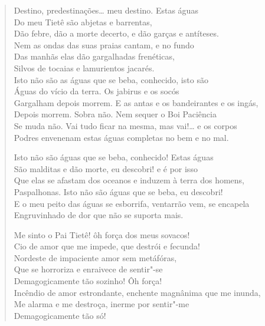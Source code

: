 \begin{verse}
Destino, predestinações\ldots{} meu destino. Estas águas\\
Do meu Tietê são abjetas e barrentas,\\
Dão febre, dão a morte decerto, e dão garças e antíteses.\\
Nem as ondas das suas praias cantam, e no fundo\\
Das manhãs elas dão gargalhadas frenéticas,\\
Silvos de tocaias e lamurientos jacarés.\\
Isto não são as águas que se beba, conhecido, isto são\\
Águas do vício da terra. Os jabirus e os socós\\
Gargalham depois morrem. E as antas e os bandeirantes e os ingás,\\
Depois morrem. Sobra não. Nem sequer o Boi Paciência\\
Se muda não. Vai tudo ficar na mesma, mas vai!\ldots{} e os corpos\\
Podres envenenam estas águas completas no bem e no mal.

Isto não são águas que se beba, conhecido! Estas águas\\
São malditas e dão morte, eu descobri! e é por isso\\
Que elas se afastam dos oceanos e induzem à terra dos homens,\\
Paspalhonas. Isto não são águas que se beba, eu descobri!\\
E o meu peito das águas se esborrifa, ventarrão vem, se encapela\\
Engruvinhado de dor que não se suporta mais.

Me sinto o Pai Tietê! ôh força dos meus sovacos!\\
Cio de amor que me impede, que destrói e fecunda!\\
Nordeste de impaciente amor sem metáfóras,\\
Que se horroriza e enraivece de sentir"-se\\
Demagogicamente tão sozinho! Ôh força!\\
Incêndio de amor estrondante, enchente magnânima que me inunda,\\
Me alarma e me destroça, inerme por sentir"-me\\
Demagogicamente tão só!


\end{verse}
